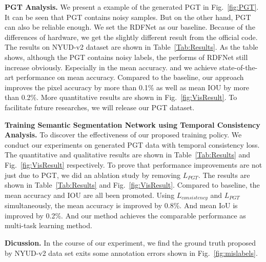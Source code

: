 {\bf PGT Analysis.} We present a example of the generated PGT in Fig.~\ref{fig:PGT}.
%
It can be seen that PGT contains noisy samples. 
%
But on the other hand, PGT can also be reliable enough.
%
We set the RDFNet as our baseline.
%
Because of the differences of hardware, we get the slightly different result from the official code.
%
The results on NYUD-v2 dataset are shown in Table~\ref{Tab:Results}.
%
As the table shows, although the PGT contains noisy labels, the performs of RDFNet still increase obviously. 
%
Especially in the mean accuracy.
%
and we achieve state-of-the-art performance on mean accuracy.
%
Compared to the baseline, our approach improves the pixel accuracy by more than 0.1\% as well as mean IOU by more than 0.2\%.
%
More quantitative results are shown in Fig.~\ref{fig:VisResult}.
%
To facilitate future researches, we will release our PGT dataset.

{\bf{Training Semantic Segmentation Network using Temporal Consistency Analysis.}} 
To discover the effectiveness of our proposed training policy. 
%
We conduct our experiments on generated PGT data with temporal consistency loss.
%
The quantitative and qualitative results are shown in Table~\ref{Tab:Results} and
Fig.~\ref{fig:VisResult} respectively.
%
To prove that performance improvements are not just due to PGT, we did an ablation study by removing $L_{PGT}$.
%
The results are shown in Table~\ref{Tab:Results} and Fig.~\ref{fig:VisResult}.
%
Compared to baseline, the mean accuracy and IOU are all been promoted.
%
Using $L_{consistency}$ and $L_{PGT}$ simultaneously, the mean accuracy is improved by 0.8\%.
%
And mean IoU is improved by 0.2\%.
%
And our method achieves the comparable performance as multi-task learning method.

{\bf{Dicussion.}} In the course of our experiment, we find the ground truth proposed by NYUD-v2 data set exits some annotation errors shown in Fig.~\ref{fig:mislabels}.

